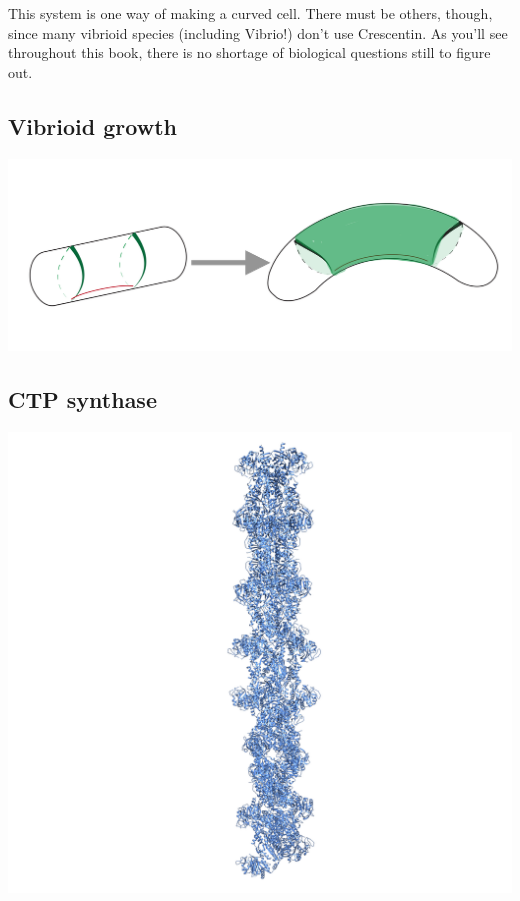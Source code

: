 \documentclass[]{tufte-book}
\begin{document}
This system is one way of making a curved cell. There must be others,
though, since many vibrioid species (including Vibrio!) don't use
Crescentin. As you'll see throughout this book, there is no shortage of
biological questions still to figure out.

\hypertarget{Vibrioid_growth}{\subsection{Vibrioid
growth}\label{Vibrioid_growth}}

\includegraphics{img/03_schematic/3_4_1_VibrioidGrowth}

\hypertarget{CTP_synthase}{\subsection{CTP
synthase}\label{CTP_synthase}}

\includegraphics{img/03_schematic/3_4_2_CTP_synthase}
\end{document}
